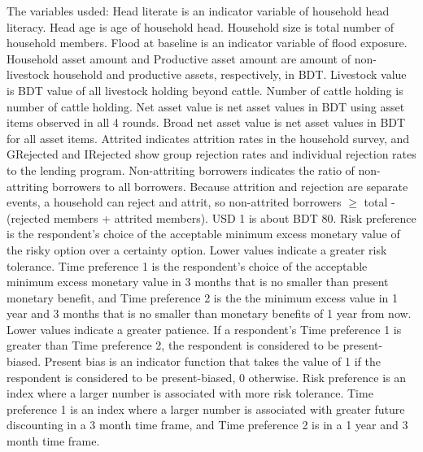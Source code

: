 The variables usded: \textsf{Head literate} is an indicator variable of household head literacy. \textsf{Head age} is age of household head. \textsf{Household size} is total number of household members. \textsf{Flood at baseline} is an indicator variable of flood exposure. \textsf{Household asset amount} and \textsf{Productive asset amount} are amount of non-livestock household and productive assets, respectively, in BDT. \textsf{Livestock value} is BDT value of all livestock holding beyond cattle. \textsf{Number of cattle holding} is number of cattle holding. \textsf{Net asset value} is net asset values in BDT using asset items observed in all 4 rounds. \textsf{Broad net asset value} is net asset values in BDT for all asset items. \textsf{Attrited} indicates attrition rates in the household survey, and \textsf{GRejected} and \textsf{IRejected} show group rejection rates and individual rejection rates to the lending program. \textsf{Non-attriting borrowers} indicates the ratio of non-attriting borrowers to all borrowers. Because attrition and rejection are separate events, a household can reject and attrit, so non-attrited borrowers $\geqslant$ total - (rejected members + attrited members). USD 1 is about BDT 80. \textsf{Risk preference} is the respondent's choice of the acceptable minimum excess monetary value of the risky option over a certainty option. Lower values indicate a greater risk tolerance. \textsf{Time preference 1} is the respondent's choice of the acceptable minimum excess monetary value in 3 months that is no smaller than present monetary benefit, and \textsf{Time preference 2} is the the minimum excess value in 1 year and 3 months that is no smaller than monetary benefits of 1 year from now. Lower values indicate a greater patience. If a respondent's \textsf{Time preference 1} is greater than \textsf{Time preference 2}, the respondent is considered to be present-biased. \textsf{Present bias} is an indicator function that takes the value of 1 if the respondent is considered to be present-biased, 0 otherwise. \textsf{Risk preference} is an index where a larger number is associated with more risk tolerance. \textsf{Time preference 1} is an index where a larger number is associated with greater future discounting in a 3 month time frame, and \textsf{Time preference 2} is in a 1 year and 3 month time frame. 
